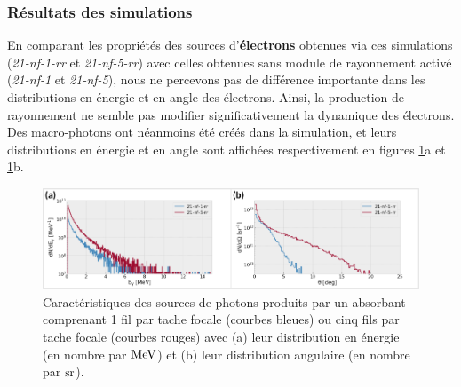 \begin{refsection}
\subsubsection{Résultats des simulations}

En comparant les propriétés des sources d'\textbf{électrons} obtenues via ces simulations (\textit{21-nf-1-rr} et \textit{21-nf-5-rr}) avec celles obtenues sans module de rayonnement activé (\textit{21-nf-1} et \textit{21-nf-5}), nous ne percevons pas de différence importante dans les distributions en énergie et en angle des électrons. Ainsi, la production de rayonnement ne semble pas modifier significativement la dynamique des électrons. Des macro-photons ont néanmoins été créés dans la simulation, et leurs distributions en énergie et en angle sont affichées respectivement en figures \ref{fig:63-sources_CIM}a et \ref{fig:63-sources_CIM}b.

\begin{figure}[hbtp]
	\centering
	\includegraphics[width=0.9\linewidth]{6-opti_numerique/absorber_rr.png}
	\caption{Caractéristiques des sources de photons produits par un absorbant comprenant 1 fil par tache focale (courbes bleues) ou cinq fils par tache focale (courbes rouges) avec (a) leur distribution en énergie (en nombre par $\rm MeV$) et (b) leur distribution angulaire (en nombre par $\rm sr$).}
	\label{fig:63-sources_CIM}
\end{figure}


\end{refsection}
